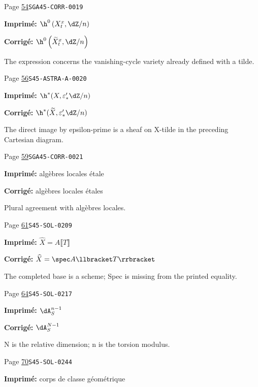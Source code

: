 \begin{description}
\smallskip
\item[\hypertarget{apparatus:FR-0023}{23}] Page \hyperlink{printpage:fr:54}{54}\quad\texttt{SGA45-CORR-0019}
\par\noindent\textbf{Imprimé:} \(\h^0\left(X_t^x,\dZ/n\right)\)
\par\noindent\textbf{Corrigé:} \(\h^0\left(\widetilde X_t^x,\dZ/n\right)\)
\par\noindent The expression concerns the vanishing-cycle variety already defined with a tilde.
\smallskip
\item[\hypertarget{apparatus:FR-0024}{24}] Page \hyperlink{printpage:fr:56}{56}\quad\texttt{S45-ASTRA-A-0020}
\par\noindent\textbf{Imprimé:} \(\h^*(X,\varepsilon_*' \dZ/n)\)
\par\noindent\textbf{Corrigé:} \(\h^*(\widetilde X,\varepsilon_*' \dZ/n)\)
\par\noindent The direct image by epsilon-prime is a sheaf on X-tilde in the preceding Cartesian diagram.
\smallskip
\item[\hypertarget{apparatus:FR-0025}{25}] Page \hyperlink{printpage:fr:59}{59}\quad\texttt{SGA45-CORR-0021}
\par\noindent\textbf{Imprimé:} algèbres locales étale
\par\noindent\textbf{Corrigé:} algèbres locales étales
\par\noindent Plural agreement with algèbres locales.
\smallskip
\item[\hypertarget{apparatus:FR-0026}{26}] Page \hyperlink{printpage:fr:61}{61}\quad\texttt{S45-SOL-0209}
\par\noindent\textbf{Imprimé:} \(\widehat X=A\llbracket T\rrbracket\)
\par\noindent\textbf{Corrigé:} \(\widehat X=\spec A\llbracket T\rrbracket\)
\par\noindent The completed base is a scheme; Spec is missing from the printed equality.
\smallskip
\item[\hypertarget{apparatus:FR-0027}{27}] Page \hyperlink{printpage:fr:64}{64}\quad\texttt{S45-SOL-0217}
\par\noindent\textbf{Imprimé:} \(\dA_S^{n-1}\)
\par\noindent\textbf{Corrigé:} \(\dA_S^{N-1}\)
\par\noindent N is the relative dimension; n is the torsion modulus.
\smallskip
\item[\hypertarget{apparatus:FR-0028}{28}] Page \hyperlink{printpage:fr:70}{70}\quad\texttt{S45-SOL-0244}
\par\noindent\textbf{Imprimé:} corps de classe géométrique

\end{description}

